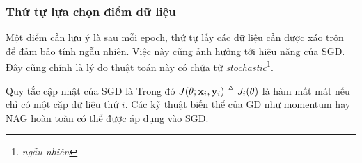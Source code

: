 \subsubsection{Thứ tự lựa chọn điểm dữ liệu}

Một điểm cần lưu ý là sau mỗi epoch, thứ tự lấy các dữ liệu cần được xáo trộn để đảm bảo tính ngẫu nhiên.
Việc này cũng ảnh hưởng tới hiệu năng của SGD. Đây cũng chính là lý do thuật
toán này có chứa từ \textit{stochastic}\footnote{\textit{ngẫu nhiên}}.

Quy tắc cập nhật của SGD là
Trong đó $J(\theta; \mathbf{x}_i, \mathbf{y}_i) \triangleq J_i(\theta)$ là hàm
mất mát nếu chỉ có một cặp dữ liệu thứ $i$. Các kỹ thuật biến
thể của GD như momentum hay NAG hoàn toàn có thể được áp dụng vào SGD.










